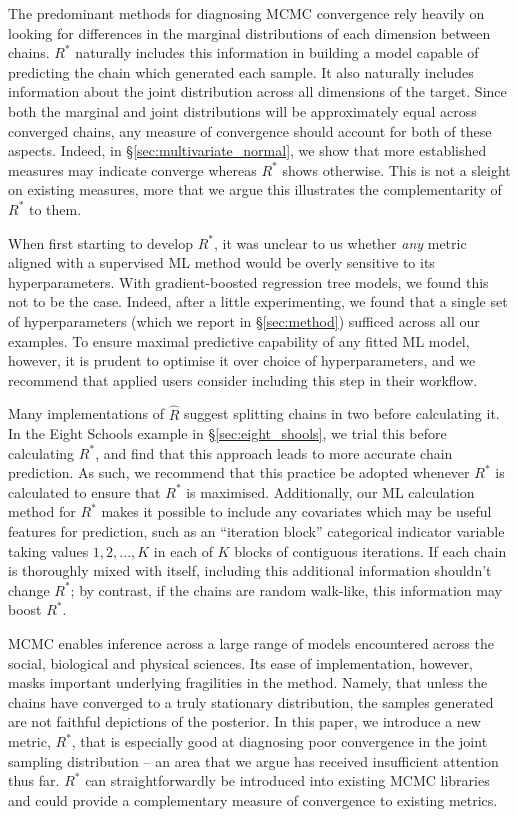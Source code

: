 \documentclass{article}
\begin{document}
The predominant methods for diagnosing MCMC convergence rely heavily on looking for differences in the marginal distributions of each dimension between chains. $R^*$ naturally includes this information in building a model capable of predicting the chain which generated each sample. It also naturally includes information about the joint distribution across all dimensions of the target. Since both the marginal and joint distributions will be approximately equal across converged chains, any measure of convergence should account for both of these aspects. Indeed, in \S\ref{sec:multivariate_normal}, we show that more established measures may indicate converge whereas $R^*$ shows otherwise. This is not a sleight on existing measures, more that we argue this illustrates the complementarity of $R^*$ to them.

When first starting to develop $R^*$, it was unclear to us whether \textit{any} metric aligned with a supervised ML method would be overly sensitive to its hyperparameters. With gradient-boosted regression tree models, we found this not to be the case. Indeed, after a little experimenting, we found that a single set of hyperparameters (which we report in \S\ref{sec:method}) sufficed across all our examples. To ensure maximal predictive capability of any fitted ML model, however, it is prudent to optimise it over choice of hyperparameters, and we recommend that applied users consider including this step in their workflow.

Many implementations of $\hat{R}$ suggest splitting chains in two before calculating it. In the Eight Schools example in \S\ref{sec:eight_shools}, we trial this before calculating $R^*$, and find that this approach leads to more accurate chain prediction. As such, we recommend that this practice be adopted whenever $R^*$ is calculated to ensure that $R^*$ is maximised. Additionally, our ML calculation method for $R^*$ makes it possible to include any covariates which may be useful features for prediction, such as an ``iteration block'' categorical indicator variable taking values $1, 2, ..., K$ in each of $K$ blocks of contiguous iterations. If each chain is thoroughly mixed with itself, including this additional information shouldn't change $R^*$; by contrast, if the chains are random walk-like, this information may boost $R^*$.

MCMC enables inference across a large range of models encountered across the social, biological and physical sciences. Its ease of implementation, however, masks important underlying fragilities in the method. Namely, that unless the chains have converged to a truly stationary distribution, the samples generated are not faithful depictions of the posterior. In this paper, we introduce a new metric, $R^*$, that is especially good at diagnosing poor convergence in the joint sampling distribution -- an area that we argue has received insufficient attention thus far. $R^*$ can straightforwardly be introduced into existing MCMC libraries and could provide a complementary measure of convergence to existing metrics.

	

 
	
\end{document}
